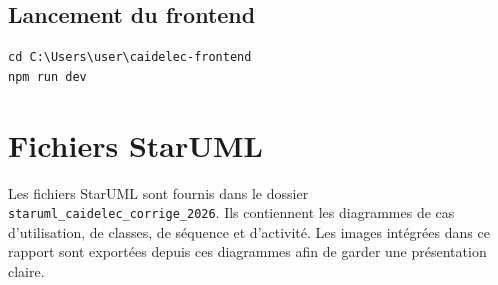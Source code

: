 \documentclass[12pt,a4paper,oneside]{report}
\begin{document}
\section{Lancement du frontend}
\begin{verbatim}
cd C:\Users\user\caidelec-frontend
npm run dev
\end{verbatim}

\chapter{Fichiers StarUML}
Les fichiers StarUML sont fournis dans le dossier \texttt{staruml\_caidelec\_corrige\_2026}. Ils contiennent les diagrammes de cas d'utilisation, de classes, de séquence et d'activité. Les images intégrées dans ce rapport sont exportées depuis ces diagrammes afin de garder une présentation claire.
\end{document}
